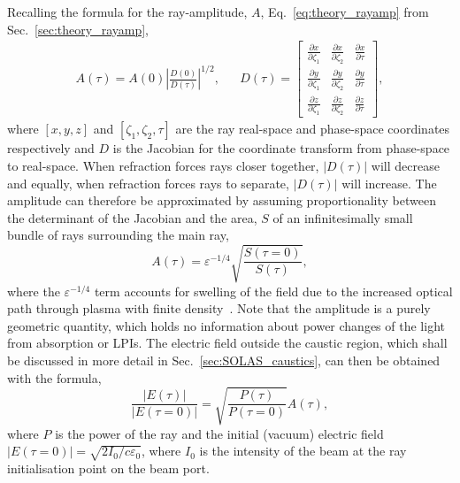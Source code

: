 Recalling the formula for the ray-amplitude, $A$, Eq.~\ref{eq:theory_rayamp} from Sec.~\ref{sec:theory_rayamp},
\begin{align}
    A(\tau) = A(0)\left| \frac{D(0)}{D(\tau)} \right|^{1/2}, &&
    D(\tau) = 
    \begin{bmatrix}
        \frac{\partial x}{\partial \zeta_1} & \frac{\partial x}{\partial \zeta_2} & \frac{\partial x}{\partial \tau} \\
        \frac{\partial y}{\partial \zeta_1} & \frac{\partial y}{\partial \zeta_2} & \frac{\partial y}{\partial \tau} \\
        \frac{\partial z}{\partial \zeta_1} & \frac{\partial z}{\partial \zeta_2} & \frac{\partial z}{\partial \tau}
    \end{bmatrix},
\end{align}
where $[x,y,z]$ and $[\zeta_1,\zeta_2,\tau]$ are the ray real-space and phase-space coordinates respectively and $D$ is the Jacobian for the coordinate transform from phase-space to real-space.
When refraction forces rays closer together, $|D(\tau)|$ will decrease and equally, when refraction forces rays to separate, $|D(\tau)|$ will increase.
The amplitude can therefore be approximated by assuming proportionality between the determinant of the Jacobian and the area, $S$ of an infinitesimally small bundle of rays surrounding the main ray,
\begin{equation}
    A(\tau) = \varepsilon^{-1/4} \sqrt{\frac{S(\tau=0)}{S(\tau)}},
\end{equation}
where the $\varepsilon^{-1/4}$ term accounts for swelling of the field due to the increased optical path through plasma with finite density~\cite{follett_validation_2022}.
Note that the amplitude is a purely geometric quantity, which holds no information about power changes of the light from absorption or \ac{LPIs}.
The electric field outside the caustic region, which shall be discussed in more detail in Sec.~\ref{sec:SOLAS_caustics}, can then be obtained with the formula,
\begin{equation}
    \frac{|E(\tau)|}{|E(\tau=0)|} = \sqrt{\frac{P(\tau)}{P(\tau=0)}}A(\tau),
\end{equation}
where $P$ is the power of the ray and the initial (vacuum) electric field $|E(\tau=0)|=\sqrt{2I_0/c \varepsilon_0}$, where $I_0$ is the intensity of the beam at the ray initialisation point on the beam port.

